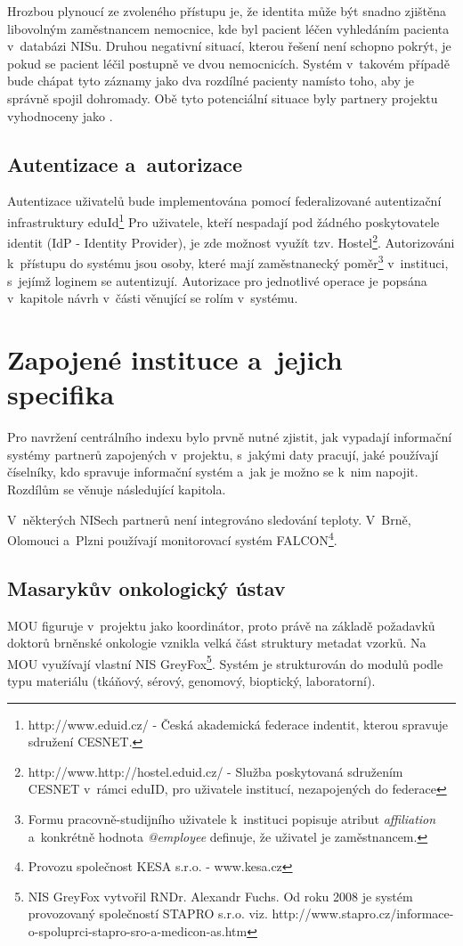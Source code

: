 Hrozbou plynoucí ze zvoleného přístupu je, že identita může být snadno zjištěna libovolným zaměstnancem nemocnice, kde byl pacient léčen vyhledáním pacienta v~databázi NISu. Druhou negativní situací, kterou řešení není schopno pokrýt, je pokud se pacient léčil postupně ve dvou nemocnicích. Systém v~takovém případě bude chápat tyto záznamy jako dva rozdílné pacienty namísto toho, aby je správně spojil dohromady. Obě tyto potenciální situace byly partnery projektu vyhodnoceny jako .

\subsection{Autentizace a~autorizace}
Autentizace uživatelů bude implementována pomocí federalizované autentizační infrastruktury eduId\footnote{http://www.eduid.cz/ - Česká akademická federace indentit, kterou spravuje sdružení CESNET.} Pro uživatele, kteří nespadají pod žádného poskytovatele identit (IdP - Identity Provider), je zde možnost využít tzv. Hostel\footnote{http://www.http://hostel.eduid.cz/ - Služba poskytovaná sdružením CESNET v~rámci eduID, pro uživatele institucí, nezapojených do federace}. 
Autorizováni k~přístupu do systému jsou osoby, které mají zaměstnanecký poměr\footnote{Formu pracovně-studijního  uživatele k~instituci popisuje atribut \textit{affiliation} a~konkrétně hodnota \textit{@employee} definuje, že uživatel je zaměstnancem.} v~instituci, s~jejímž loginem se autentizují.
Autorizace pro jednotlivé operace je popsána v~kapitole návrh v~části věnující se rolím v~systému.

\section{Zapojené instituce a~jejich specifika}
Pro navržení centrálního indexu bylo prvně nutné zjistit, jak vypadají informační systémy partnerů zapojených v~projektu, s~jakými daty pracují, jaké používají číselníky, kdo spravuje informační systém a~jak je možno se k~nim napojit. Rozdílům se věnuje následující kapitola.

V~některých NISech partnerů není integrováno sledování teploty. V~Brně, Olomouci a~Plzni používají monitorovací systém FALCON\footnote{Provozu společnost KESA s.r.o. - www.kesa.cz}.
\subsection{Masarykův onkologický ústav}
MOU figuruje v~projektu jako koordinátor, proto právě na základě požadavků doktorů brněnské onkologie vznikla velká část struktury metadat vzorků. Na MOU využívají vlastní NIS GreyFox\footnote{NIS GreyFox vytvořil RNDr. Alexandr Fuchs. Od roku 2008 je systém provozovaný společností STAPRO s.r.o. viz. http://www.stapro.cz/informace-o-spoluprci-stapro-sro-a-medicon-as.htm}. Systém je strukturován do modulů podle typu materiálu (tkáňový, sérový, genomový, bioptický, laboratorní). 

